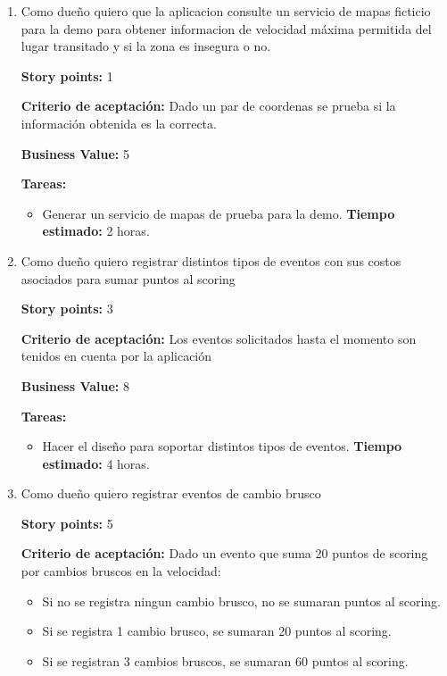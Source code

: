 \begin{enumerate}

\item Como dueño quiero que la aplicacion consulte un servicio de mapas ficticio para la demo para obtener informacion de velocidad máxima permitida del lugar transitado y si la zona es insegura o no.

\textbf{Story points:} 1

\textbf{Criterio de aceptación:}
Dado un par de coordenas se prueba si la información obtenida es la correcta.

\textbf{Business Value:} 5

\textbf{Tareas:}
	\begin{itemize}
		\item Generar un servicio de mapas de prueba para la demo.
		\newline \textbf{Tiempo estimado:} 2 horas. 
	\end{itemize}







\item Como dueño quiero registrar distintos tipos de eventos con sus costos asociados para sumar puntos al scoring

\textbf{Story points:} 3

\textbf{Criterio de aceptación:}
Los eventos solicitados hasta el momento son tenidos en cuenta por la aplicación

\textbf{Business Value:} 8

\textbf{Tareas:}
	\begin{itemize}
		\item Hacer el diseño para soportar distintos tipos de eventos.
		\newline \textbf{Tiempo estimado:} 4 horas. 
	\end{itemize}






\item Como dueño quiero registrar eventos de cambio brusco

\textbf{Story points:} 5

\textbf{Criterio de aceptación:}
Dado un evento que suma 20 puntos de scoring por cambios bruscos en la velocidad:
\begin{itemize} 
	\item Si no se registra ningun cambio brusco, no se sumaran puntos al scoring.
	\item Si se registra 1 cambio brusco, se sumaran 20 puntos al scoring.
	\item Si se registran 3 cambios bruscos, se sumaran 60 puntos al scoring.
\end{itemize}


\end{enumerate}
